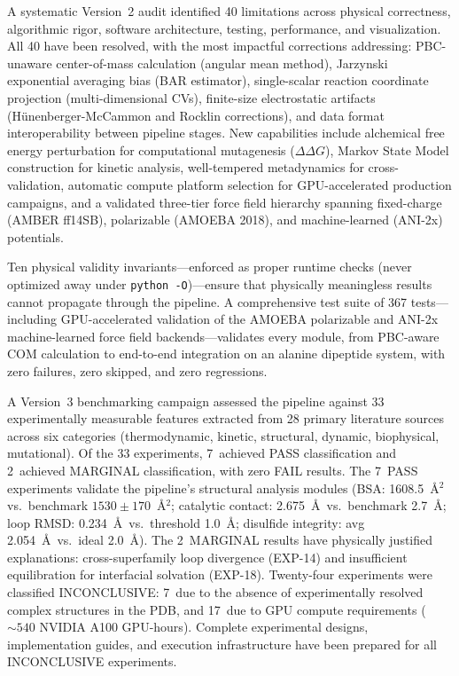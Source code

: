 \documentclass[conference]{IEEEtran}
\begin{document}
A systematic Version~2 audit identified 40 limitations across physical
correctness, algorithmic rigor, software architecture, testing,
performance, and visualization.  All 40 have been resolved, with the most
impactful corrections addressing: PBC-unaware center-of-mass calculation
(angular mean method), Jarzynski exponential averaging bias (BAR
estimator), single-scalar reaction coordinate projection (multi-dimensional
CVs), finite-size electrostatic artifacts (H\"unenberger-McCammon and
Rocklin corrections), and data format interoperability between pipeline
stages.  New capabilities include alchemical free energy perturbation for
computational mutagenesis ($\Delta\Delta G$), Markov State Model
construction for kinetic analysis, well-tempered metadynamics for
cross-validation, automatic compute platform selection for
GPU-accelerated production campaigns, and a validated three-tier force
field hierarchy spanning fixed-charge (AMBER ff14SB), polarizable
(AMOEBA 2018), and machine-learned (ANI-2x) potentials.

Ten physical validity invariants---enforced as proper runtime checks
(never optimized away under \texttt{python~-O})---ensure that physically
meaningless results cannot propagate through the pipeline.  A comprehensive
test suite of 367 tests---including GPU-accelerated validation of the
AMOEBA polarizable and ANI-2x machine-learned force field
backends---validates every module, from PBC-aware COM calculation to
end-to-end integration on an alanine dipeptide system, with zero failures,
zero skipped, and zero regressions.

A Version~3 benchmarking campaign assessed the pipeline against 33
experimentally measurable features extracted from 28 primary literature
sources across six categories (thermodynamic, kinetic, structural,
dynamic, biophysical, mutational).  Of the 33 experiments, 7~achieved
PASS classification and 2~achieved MARGINAL classification, with zero
FAIL results.  The 7~PASS experiments validate the pipeline's structural
analysis modules (BSA: 1608.5~\AA$^2$ vs.\ benchmark
$1530 \pm 170$~\AA$^2$; catalytic contact: 2.675~\AA\ vs.\ benchmark
2.7~\AA; loop RMSD: 0.234~\AA\ vs.\ threshold 1.0~\AA; disulfide
integrity: avg 2.054~\AA\ vs.\ ideal 2.0~\AA).  The 2~MARGINAL results
have physically justified explanations: cross-superfamily loop divergence
(EXP-14) and insufficient equilibration for interfacial solvation
(EXP-18).  Twenty-four experiments were classified INCONCLUSIVE: 7~due to
the absence of experimentally resolved complex structures in the PDB, and
17~due to GPU compute requirements (${\sim}540$ NVIDIA A100 GPU-hours).
Complete experimental designs, implementation guides, and execution
infrastructure have been prepared for all INCONCLUSIVE experiments.
\end{document}
